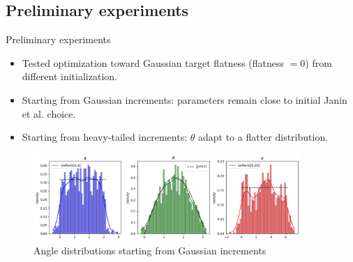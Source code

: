 \documentclass[11pt]{beamer}
\begin{document}
\subsection{Preliminary experiments}
\begin{frame}{Preliminary experiments}
  \begin{itemize}
    \item Tested optimization toward Gaussian target flatness (flatness $=0$) from different initialization.
    \item Starting from Gaussian increments: parameters remain close to initial Janin et al. choice.
    \item Starting from heavy-tailed increments: $\theta$ adapt to a flatter distribution.
  \end{itemize}
  \begin{figure}
    \centering
    \includegraphics[width=0.9\textwidth]{illustrations/StartGaussian.png}
    \caption{Angle distributions starting from Gaussian increments}
  \end{figure}
\end{frame}

\end{document}
